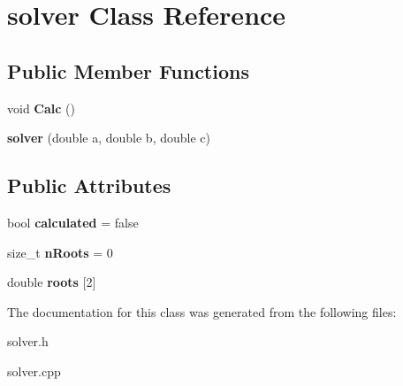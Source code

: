 \hypertarget{classsolver}{}\section{solver Class Reference}
\label{classsolver}
\subsection*{Public Member Functions}
\begin{DoxyCompactItemize}
\item 
\mbox{\label{classsolver_a6c53936b4d3f14c00e900b5d62b0bc48}} 
void {\bfseries Calc} ()
\item 
\mbox{\label{classsolver_a3273bce3a40c342669b59fe193d09879}} 
{\bfseries solver} (double a, double b, double c)
\end{DoxyCompactItemize}
\subsection*{Public Attributes}
\begin{DoxyCompactItemize}
\item 
\mbox{\label{classsolver_a2b9a50fb912fcde4d4878e360ebbc0e6}} 
bool {\bfseries calculated} = false
\item 
\mbox{\label{classsolver_ab7904b8b6abce92d1f68a4533d6f2352}} 
size\+\_\+t {\bfseries n\+Roots} = 0
\item 
\mbox{\label{classsolver_ad9f76bae6c17eba80442618016a95d57}} 
double {\bfseries roots} \mbox{[}2\mbox{]}
\end{DoxyCompactItemize}


The documentation for this class was generated from the following files\+:\begin{DoxyCompactItemize}
\item 
solver.\+h\item 
solver.\+cpp\end{DoxyCompactItemize}
